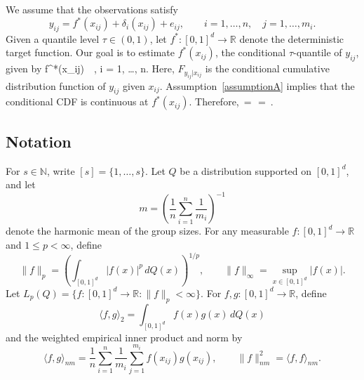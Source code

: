 \documentclass[twoside,11pt]{article}
\newcommand{\rev}[1]{{\color{revisionred}#1}}
\newenvironment{revision}{\color{revisionred}}{}
\begin{document}
\begin{revision}
We assume that the observations satisfy
\begin{equation}
y_{ij}=f^*(x_{ij})+\delta_i(x_{ij})+e_{ij},
\qquad i=1,\ldots,n,\quad j=1,\ldots,m_i. \label{eq:data_model}
\end{equation}
Given a quantile level $\tau \in (0,1)$, let
$f^* : [0, 1]^d \to \mathbb{R}$ denote the deterministic target function.
Our goal is to estimate $f^*(x_{ij})$, the conditional $\tau$-quantile of $y_{ij}$, given by
\bea
f^*(x_{ij}) \,\rev{\coloneqq}\, \rev{\inf{}}, \quad {} i = 1, \ldots, n.
\bea
Here, $F_{y_{ij}|x_{ij}}$ is the conditional cumulative distribution function of $y_{ij}$ given $x_{ij}$.
\rev{Assumption~\ref{assumptionA} implies that the conditional CDF is continuous at $f^*(x_{ij})$. Therefore,}
\beq
\label{exact_calibration}
 \,=\,
 \,=\, \tau.
\beq
\end{revision}




 

\subsection{Notation}

\begin{revision}
For $s \in \mathbb{N}$, write $[s]=\{1,\ldots,s\}$. Let $Q$ be a distribution supported on $[0,1]^d$, and let
\[
m=\left(\frac{1}{n}\sum_{i=1}^n\frac{1}{m_i}\right)^{-1}
\]
denote the harmonic mean of the group sizes. For any measurable
$f:[0,1]^d\to\mathbb{R}$ and $1\leq p<\infty$, define
\[
\|f\|_p=\left(\int_{[0,1]^d}|f(x)|^p\,dQ(x)\right)^{1/p},
\qquad
\|f\|_\infty=\sup_{x\in[0,1]^d}|f(x)|.
\]
Let $L_p(Q)=\{f:[0,1]^d\to\mathbb{R}:\|f\|_p<\infty\}$. For
$f,g:[0,1]^d\to\mathbb{R}$, define
\[
\langle f,g\rangle_2=\int_{[0,1]^d}f(x)g(x)\,dQ(x)
\]
and the weighted empirical inner product and norm by
\[
\langle f,g\rangle_{nm}
=\frac{1}{n}\sum_{i=1}^n\frac{1}{m_i}\sum_{j=1}^{m_i}
f(x_{ij})g(x_{ij}),
\qquad
\|f\|_{nm}^2=\langle f,f\rangle_{nm}.
\]
\end{revision}
\end{document}
